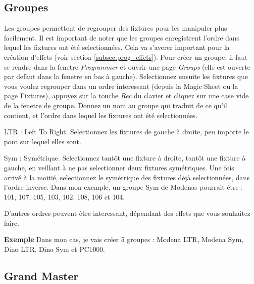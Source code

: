 \subsection{Groupes}
\label{subsec:prep_groupes}

Les groupes permettent de regrouper des fixtures pour les manipuler plus facilement.
\newline
Il est important de noter que les groupes enregistrent l'ordre dans lequel les fixtures ont été selectionnées.
Cela va s'averer important pour la création d'effets (voir section \ref{subsec:prog_effets}).
\newline
\newline
Pour créer un groupe, il faut se rendre dans la fenetre \textit{Programmer} et ouvrir une page \textit{Groups}
(elle est ouverte par defaut dans la fenetre en bas à gauche).
\newline
Selectionnez ensuite les fixtures que vous voulez regrouper dans un ordre interessant (depuis la Magic Sheet ou la page Fixtures), appuyez sur la touche \textit{Rec} du clavier et cliquez sur une case vide de la fenetre de groupe.
Donnez un nom au groupe qui traduit de ce qu'il contient, et l'ordre dans lequel les fixtures ont été selectionnées.
\newline
\newline
\begin{list}{-}{Ordres de selection utiles :}
    \item LTR : Left To Right. Selectionnez les fixtures de gauche à droite, peu importe le pont sur lequel elles sont.
    \item Sym : Symétrique. Selectionnez tantôt une fixture à droite, tantôt une fixture à gauche, en veillant à ne pas selectionner
deux fixtures symétriques. Une fois arrivé à la moitié, selectionnez le symétrique des fixtures déjà selectionnées, dans l'ordre inverse.
\newline
Dans mon exemple, un groupe Sym de Modenas pourrait être : 101, 107, 105, 103, 102, 108, 106 et 104.
    \item D'autres ordres peuvent être interessant, dépendant des effets que vous souhaitez faire.
\end{list}
\textbf{Exemple}
\newline
\newline
Dans mon cas, je vais créer 5 groupes : Modena LTR, Modena Sym, Dino LTR, Dino Sym et PC1000.

\subsection{Grand Master}
\label{subsec:prep_gm}

